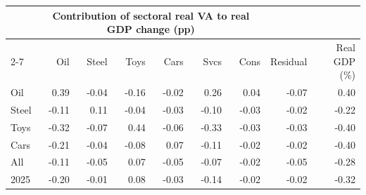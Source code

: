 \begin{tabular}{lrrrrrrrr}
\toprule
 & \multicolumn{6}{c}{Contribution of sectoral real VA to real GDP change (pp)} & & \\
\cmidrule(lr){2-7}
 & Oil & Steel & Toys & Cars & Svcs & Cons & Residual & Real GDP (\%) \\
\midrule
Oil & 0.39 & -0.04 & -0.16 & -0.02 & 0.26 & 0.04 & -0.07 & 0.40 \\
Steel & -0.11 & 0.11 & -0.04 & -0.03 & -0.10 & -0.03 & -0.02 & -0.22 \\
Toys & -0.32 & -0.07 & 0.44 & -0.06 & -0.33 & -0.03 & -0.03 & -0.40 \\
Cars & -0.21 & -0.04 & -0.08 & 0.07 & -0.11 & -0.02 & -0.02 & -0.40 \\
All & -0.11 & -0.05 & 0.07 & -0.05 & -0.07 & -0.02 & -0.05 & -0.28 \\
2025 & -0.20 & -0.01 & 0.08 & -0.03 & -0.14 & -0.02 & -0.02 & -0.32 \\
\bottomrule
\end{tabular}

